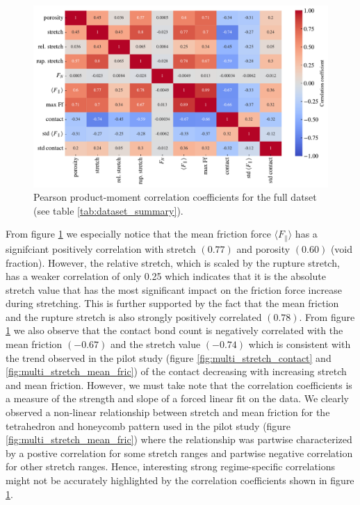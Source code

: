 \begin{figure}[H]
  \centering
  \includegraphics[width=\linewidth]{figures/ML/corrcoef_matrix.pdf}
  \caption{Pearson product-moment correlation coefficients for the full datset (see table \ref{tab:dataset_summary}).}
  \label{fig:corrcoef_matrix}
\end{figure}

From figure \ref{fig:corrcoef_matrix} we especially notice that the mean
friction force $\langle F_{\parallel} \rangle$ has a signifciant positively
correlation with stretch $(0.77)$ and porosity $(0.60)$ (void fraction).
However, the relative stretch, which is scaled by the rupture stretch, has a
weaker correlation of only 0.25 which indicates that it is the absolute stretch
value that has the most significant impact on the friction force increase during
stretching. This is further supported by the fact that the mean friction and the
rupture stretch is also strongly positively correlated $(0.78)$. From figure
\ref{fig:corrcoef_matrix} we also observe that the contact bond count is
negatively correlated with the mean friction $(-0.67)$ and the stretch value
$(-0.74)$ which is consistent with the trend observed in the pilot study (figure \ref{fig:multi_stretch_contact} and \ref{fig:multi_stretch_mean_fric}) of the
contact decreasing with increasing stretch and mean friction. However, we must
take note that the correlation coefficients is a measure of the strength and slope of a
forced linear fit on the data. We clearly observed a non-linear relationship between stretch and mean friction for the tetrahedron and honeycomb pattern used in the pilot study (figure \ref{fig:multi_stretch_mean_fric}) where the relationship was partwise characterized by a postive correlation for some stretch ranges and partwise negative correlation for other stretch ranges. Hence, interesting strong regime-specific correlations might not be accurately highlighted by the correlation coefficients shown in figure \ref{fig:corrcoef_matrix}.

